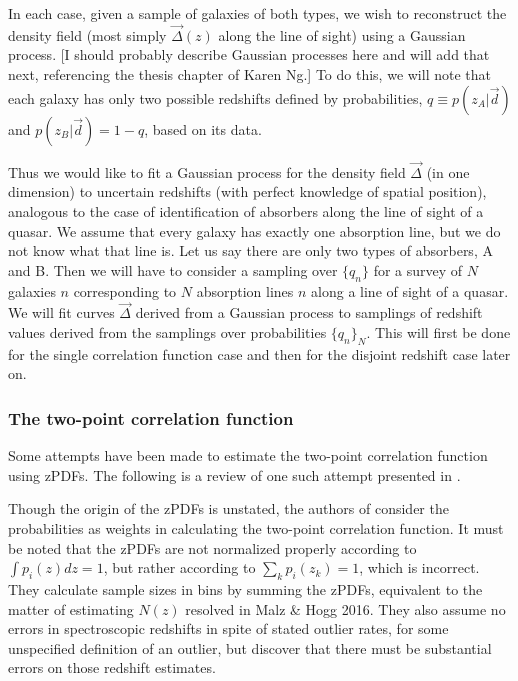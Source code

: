 \documentclass[12pt, onecolumn]{emulateapj}
\begin{document}
In each case, given a sample of galaxies of both types, we wish to reconstruct the density field (most simply $\vec{\Delta}(z)$ along the line of sight) using a Gaussian process.  [I should probably describe Gaussian processes here and will add that next, referencing the thesis chapter of Karen Ng.]  To do this, we will note that each galaxy has only two possible redshifts defined by probabilities, $q\equiv p(z_{A}|\vec{d})$ and $p(z_{B}|\vec{d})=1-q$, based on its data.  

Thus we would like to fit a Gaussian process for the density field $\vec{\Delta}$ (in one dimension) to uncertain redshifts (with perfect knowledge of spatial position), analogous to the case of identification of absorbers along the line of sight of a quasar.  We assume that every galaxy has exactly one absorption line, but we do not know what that line is.  Let us say there are only two types of absorbers, A and B.  Then we will have to consider a sampling over $\{q_{n}\}$ for a survey of $N$ galaxies $n$ corresponding to $N$ absorption lines $n$ along a line of sight of a quasar.  We will fit curves $\vec{\Delta}$ derived from a Gaussian process to samplings of redshift values derived from the samplings over probabilities $\{q_{n}\}_{N}$.  This will first be done for the single correlation function case and then for the disjoint redshift case later on.

\subsubsection{The two-point correlation function}

Some attempts have been made to estimate the two-point correlation function using zPDFs.  The following is a review of one such attempt presented in \citet{all16}.

Though the origin of the zPDFs is unstated, the authors of \citet{all16} consider the probabilities as weights in calculating the two-point correlation function.  It must be noted that the zPDFs are not normalized properly according to $\int p_{i}(z)dz=1$, but rather according to $\sum_{k}p_{i}(z_{k})=1$, which is incorrect.  They calculate sample sizes in bins by summing the zPDFs, equivalent to the matter of estimating $N(z)$ resolved in Malz \& Hogg 2016.  They also assume no errors in spectroscopic redshifts in spite of stated outlier rates, for some unspecified definition of an outlier, but discover that there must be substantial errors on those redshift estimates.  
\end{document}
